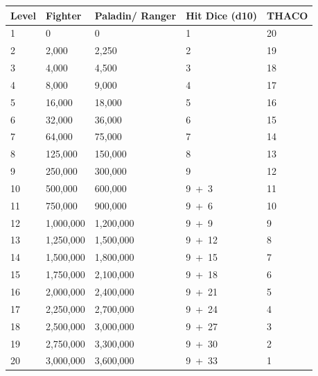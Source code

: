 \noindent
\begin{minipage}{\columnwidth}

\label{warrioradvancement}
\noindent
\begin{tabular}{|m{}|m{}|m{}|m{}|m{}|}
\hline
Level	& Fighter	& Paladin/ Ranger	& Hit Dice (d10)	& THACO \\
\hline\hline
\rowcolor[gray]{.9}1		& 0			& 0			& 1		& 20 \\
2		& 2,000		& 2,250		& 2		& 19 \\
\rowcolor[gray]{.9}3		& 4,000		& 4,500		& 3		& 18 \\
4		& 8,000		& 9,000		& 4		& 17 \\
\rowcolor[gray]{.9}5		& 16,000	& 18,000	& 5		& 16 \\
6		& 32,000	& 36,000	& 6		& 15 \\
\rowcolor[gray]{.9}7		& 64,000	& 75,000	& 7		& 14 \\
8		& 125,000	& 150,000	& 8		& 13 \\
\rowcolor[gray]{.9}9		& 250,000	& 300,000	& 9		& 12 \\
10		& 500,000	& 600,000	& 9~+~3	& 11 \\
\rowcolor[gray]{.9}11		& 750,000	& 900,000	& 9~+~6	& 10 \\
12		& 1,000,000	& 1,200,000	& 9~+~9	& 9 \\
\rowcolor[gray]{.9}13		& 1,250,000	& 1,500,000	& 9~+~12	& 8 \\
14		& 1,500,000	& 1,800,000	& 9~+~15	& 7 \\
\rowcolor[gray]{.9}15		& 1,750,000	& 2,100,000	& 9~+~18	& 6 \\
16		& 2,000,000	& 2,400,000	& 9~+~21	& 5 \\
\rowcolor[gray]{.9}17		& 2,250,000	& 2,700,000	& 9~+~24	& 4 \\
18		& 2,500,000	& 3,000,000	& 9~+~27	& 3 \\
\rowcolor[gray]{.9}19		& 2,750,000	& 3,300,000	& 9~+~30	& 2 \\
20		& 3,000,000	& 3,600,000	& 9~+~33	& 1 \\
\hline
\end{tabular}

\end{minipage}

